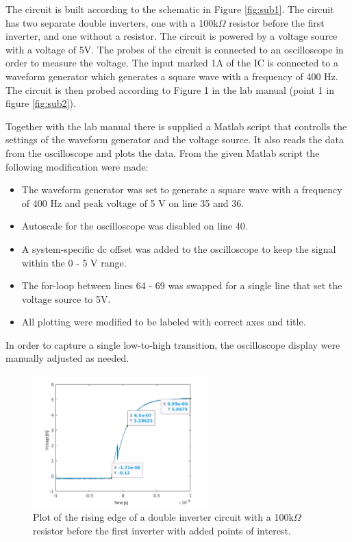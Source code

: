 \documentclass[onecolumn]{article}
\begin{document}
The circuit is built according to the schematic in Figure \ref{fig:sub1}. The circuit has two separate double inverters, one with a 100k$\Omega$ resistor before the first inverter, and one without a resistor. The circuit is powered by a voltage source with a voltage of 5V. The probes of the circuit is connected to an oscilloscope in order to measure the voltage. The input marked 1A of the IC is connected to a waveform generator which generates a square wave with a frequency of 400 Hz. The circuit is then probed according to Figure 1 in the lab manual (point 1 in figure \ref{fig:sub2}).

Together with the lab manual there is supplied a Matlab script that controlls the settings of the waveform generator and the voltage source. It also reads the data from the oscilloscope and plots the data. From the given Matlab script the following modification were made:
\begin{itemize}
  \item The waveform generator was set to generate a square wave with a frequency of 400 Hz and peak voltage of 5 V on line 35 and 36.
  \item Autoscale for the oscilloscope was disabled on line 40.
  \item A system-specific dc offset was added to the oscilloscope to keep the signal within the 0 - 5 V range.
  \item The for-loop between lines 64 - 69 was swapped for a single line that set the voltage source to 5V.
  \item All plotting were modified to be labeled with correct axes and title.
\end{itemize}

In order to capture a single low-to-high transition, the oscilloscope display were manually adjusted as needed.
\begin{figure}[h!]
    \centering
    \includegraphics[width=0.6\textwidth]{plot1.png}
    \caption{Plot of the rising edge of a double inverter circuit with a 100k$\Omega$ resistor before the first inverter with added points of interest.}
    \label{fig:plot}
\end{figure}
\end{document}
